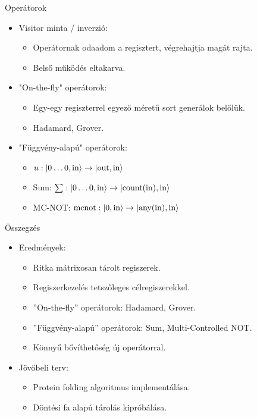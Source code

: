 \documentclass[aspectratio=169]{beamer}
\begin{document}
\begin{frame}{Operátorok}

\begin{itemize}
    \item Visitor minta / inverzió:
    \begin{itemize}
        \item Operátornak odaadom a regisztert, végrehajtja magát rajta.
        \item Belső működés eltakarva.
    \end{itemize}
    \item "On-the-fly" operátorok:
    \begin{itemize}
        \item Egy-egy regiszterrel egyező méretű sort generálok belőlük.
        \item Hadamard, Grover.
    \end{itemize}
    \item "Függvény-alapú" operátorok:
    \begin{itemize}
        \item $u: \ket{0\dots{}0,\text{in}} \rightarrow \ket{\text{out},\text{in}}$
        \item Sum: $\sum: \ket{0\dots{}0,\text{in}} \rightarrow \ket{\text{count}(\text{in}),\text{in}}$
        \item MC-NOT: $\text{mcnot}: \ket{0,\text{in}} \rightarrow \ket{\text{any}(\text{in}),\text{in}}$
    \end{itemize}
\end{itemize}


\end{frame}

\begin{frame}{Összegzés}

\begin{itemize}
\item Eredmények:
\begin{itemize}
    \item Ritka mátrixosan tárolt regiszerek.
    \item Regiszerkezelés tetszőleges célregiszerekkel.
    \item ''On-the-fly'' operátorok: Hadamard, Grover.
    \item ''Függvény-alapú'' operátorok: Sum, Multi-Controlled NOT.
    \item Könnyű bővíthetőség új operátorral.
\end{itemize}
\item Jövőbeli terv:
\begin{itemize}
    \item Protein folding algoritmus implementálása.
    \item Döntési fa alapú tárolás kipróbálása.
\end{itemize}
\end{itemize}

\end{frame}
\end{document}

